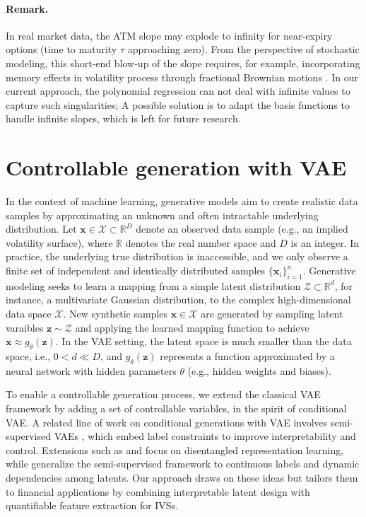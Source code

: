 \documentclass{article}
\begin{document}
\paragraph{Remark.} In real market data, the ATM slope may explode to infinity for near-expiry options (time to maturity $\tau$ approaching zero). From the perspective of stochastic modeling, this short-end blow-up of the slope requires, for example,  incorporating  memory effects in volatility process  through fractional Brownian motions \citep{Bayer02062016}. In our current  approach, the polynomial regression can not deal with infinite values to capture such singularities; A possible solution is to adapt the basis functions to handle infinite slopes, which is left for future research.   


\section{Controllable generation with VAE}\label{sec:CVAE}

In the context of machine learning, generative models aim to create realistic data samples by approximating an unknown and often intractable underlying distribution. Let $\mathbf{x} \in \mathcal{X} \subset \mathbb{R}^D$ denote an observed data sample (e.g., an implied volatility surface), where $\mathbb{R}$ denotes the real number space and $D$ is an integer. In practice, the underlying true distribution is inaccessible, and we only observe a finite set of independent and identically distributed samples $\{\mathbf{x}_i\}_{i=1}^n$.  Generative modeling seeks to learn a mapping from a simple latent distribution $\mathcal{Z} \subset \mathbb{R}^d$, for instance, a multivariate Gaussian distribution, to the complex high-dimensional data space $\mathcal{X}$.  New synthetic samples $\mathbf{x} \in \mathcal{X}$ are generated by sampling latent varaibles $\mathbf{z} \sim \mathcal{Z}$ and applying the learned mapping function to achieve $\mathbf{x} \approx g_\theta(\mathbf{z})$. In the VAE setting,  the latent space is much smaller than the data space, i.e., $0 < d \ll D$, and $g_\theta(\mathbf{z})$ represents a function approximated by a neural network with hidden parameters $\theta$ (e.g., hidden weights and biases). 


To enable a controllable generation process, we extend the classical VAE framework \citep{kingma2014semi} by adding a set of controllable variables, in the spirit of conditional VAE. A related line of work on conditional generations with VAE involves semi-supervised VAEs \citep{kingma2014semi}, which embed label constraints to improve interpretability and control. Extensions such as \citep{li2019disentangled} and \citep{joycapturing} focus on disentangled representation learning, while \citep{paige2017learning} generalize the semi-supervised framework to continuous labels and dynamic dependencies among latents. Our approach draws on these ideas but tailors them to financial applications by combining interpretable latent design with quantifiable feature extraction for IVSs. 
\end{document}
